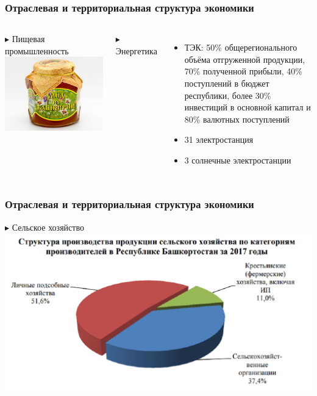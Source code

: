 \begin{frame}
\frametitle{Отраслевая и территориальная структура экономики}
\begin{columns}
$\blacktriangleright$ Пищевая промышленность\\[20pt]
\includegraphics[width=1\linewidth]{pics/sasha/honey}

$\blacktriangleright$ Энергетика\\[2pt]
\begin{itemize}
\item ТЭК: 50\% общерегионального объёма отгруженной продукции, 70\% полученной прибыли, 40\% поступлений в бюджет республики, более 30\% инвестиций в основной капитал и 80\% валютных поступлений
\item 31 электростанция
\item 3 солнечные электростанции
\end{itemize}
\end{columns}
\end{frame}

\begin{frame}
\frametitle{Отраслевая и территориальная структура экономики}

$\blacktriangleright$ Сельское хозяйство
\includegraphics[width=1\linewidth]{pics/sasha/agriculture_struct}

\end{frame}

